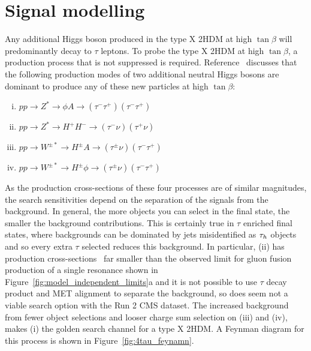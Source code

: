 \section{Signal modelling}
\label{sec:4tau_signal_modelling}

Any additional Higgs boson produced in the type X \ac{2HDM} at high $\tan\beta$ will predominantly decay to $\tau$ leptons.
To probe the type X \ac{2HDM} at high $\tan\beta$, a production process that is not suppressed is required.
Reference~\cite{Jueid:2021avn} discusses that the following production modes of two additional neutral Higgs bosons are dominant to produce any of these new particles at high $\tan\beta$:
\begin{enumerate}[i)]
  \item $pp \rightarrow Z^{*} \rightarrow \phi A \rightarrow (\tau^{-}\tau^{+})(\tau^{-}\tau^{+})$
  \item $pp \rightarrow Z^{*} \rightarrow H^{+}H^{-} \rightarrow (\tau^{-}\nu)(\tau^{+}\nu)$
  \item $pp \rightarrow W^{\pm *} \rightarrow H^{\pm}A \rightarrow (\tau^{\pm}\nu)(\tau^{-}\tau^{+})$
  \item $pp \rightarrow W^{\pm *} \rightarrow H^{\pm}\phi \rightarrow (\tau^{\pm}\nu)(\tau^{-}\tau^{+})$
\end{enumerate}
As the production cross-sections of these four processes are of similar magnitudes, the search sensitivities depend on the separation of the signals from the background.
In general, the more objects you can select in the final state, the smaller the background contributions.
This is certainly true in $\tau$ enriched final states, where backgrounds can be dominated by jets misidentified as $\tau_{h}$ objects and so every extra $\tau$ selected reduces this background.
In particular, (ii) has production cross-sections~\cite{Jueid:2021avn} far smaller than the observed limit for gluon fusion production of a single resonance shown in Figure~\ref{fig:model_independent_limits}a and it is not possible to use $\tau$ decay product and \ac{MET} alignment to separate the background, so does seem not a viable search option with the Run 2 \ac{CMS} dataset.
The increased background from fewer object selections and looser charge sum selection on (iii) and (iv), makes (i) the golden search channel for a type X \ac{2HDM}. 
A Feynman diagram for this process is shown in Figure~\ref{fig:4tau_feynamn}. \\

